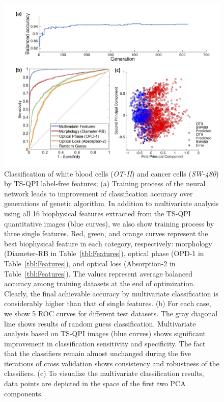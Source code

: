 \documentclass[aps,pra,reprint,superscriptaddress]{revtex4-1}
\begin{document}
\begin{figure}
\includegraphics[scale=0.08]{FigureOTSWROC.jpg}
\caption{\label{fig:OTSWROC} Classification of white blood cells (\textit{OT-II}) and cancer cells (\textit{SW-480}) by TS-QPI label-free features; (a) Training process of the neural network leads to improvement of classification accuracy over generations of genetic algorithm. In addition to multivariate analysis using all 16 biophysical features extracted from the TS-QPI quantitative images (blue curves), we also show training process by three single features. Red, green, and orange curves represent the best biophysical feature in each category, respectively: morphology (Diameter-RB in Table~\ref{tbl:Features}), optical phase (OPD-1 in Table~\ref{tbl:Features}), and optical loss (Absorption-2 in Table~\ref{tbl:Features}). The values represent average balanced accuracy among training datasets at the end of optimization. Clearly, the final achievable accuracy by multivariate classification is considerably higher than that of single features. (b) For each case, we show 5 ROC curves for different test datasets. The gray diagonal line shows results of random guess classification. Multivariate analysis based on TS-QPI images (blue curves) shows significant improvement in classification sensitivity and specificity. The fact that the classifiers remain almost unchanged during the five iterations of cross validation shows consistency and robustness of the classifiers. (c) To visualize the multivariate classification results, data points are depicted in the space of the first two PCA components.}
\end{figure}
\end{document}
